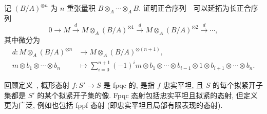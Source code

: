 \begin{exercise}\label{src:3.1.3}
记 $(B/A)^{\otimes n}$ 为 $n$ 重张量积 $B\otimes_A\cdots\otimes_A B$. 证明正合序列~~可以延拓为长正合序列
\[
0\longrightarrow M\xrightarrow{d}M\otimes_A(B/A)^{\otimes1}
\xrightarrow{d}M\otimes_A(B/A)^{\otimes2}\xrightarrow{d}\cdots,
\]
其中微分为
\[
\begin{aligned}
d:M\otimes_A(B/A)^{\otimes n}&\longrightarrow M\otimes_A(B/A)^{\otimes(n+1)},\\
m\otimes b_1\otimes\cdots\otimes b_n
&\longmapsto\sum_{i=0}^{n+1}(-1)^i
m\otimes b_1\otimes\cdots\otimes b_{i-1}\otimes1
\otimes b_{i+1}\otimes\cdots\otimes b_n.
\end{aligned}
\]
\end{exercise}
回顾定义~, 概形态射 $f:S'\to S$ 是 fpqc 的, 是指 $f$ 忠实平坦, 且 $S$ 的每个拟紧开子集都是 $S'$ 的某个拟紧开子集的像. Fpqc 态射包括忠实平坦且拟紧的态射, 但定义更为广泛, 例如也包括 fppf 态射 (即忠实平坦且局部有限表现的态射).

